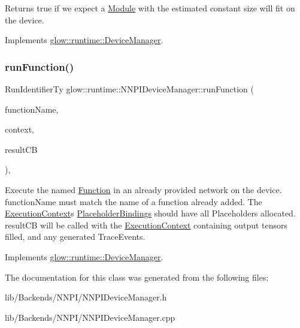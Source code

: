 \begin{DoxyReturn}{Returns}
true if we expect a \hyperlink{classglow_1_1_module}{Module} with the estimated constant size will fit on the device. 
\end{DoxyReturn}


Implements \hyperlink{classglow_1_1runtime_1_1_device_manager_ae9bba4abda9cb6aa1359a69e942feb22}{glow\+::runtime\+::\+Device\+Manager}.

\mbox{\label{classglow_1_1runtime_1_1_n_n_p_i_device_manager_a86f8010d5b5c6f235144d930f8392d3a}} 
\subsubsection{\texorpdfstring{run\+Function()}{runFunction()}}
{\footnotesize\ttfamily Run\+Identifier\+Ty glow\+::runtime\+::\+N\+N\+P\+I\+Device\+Manager\+::run\+Function (\begin{DoxyParamCaption}\item[{std\+::string}]{function\+Name,  }\item[{std\+::unique\+\_\+ptr$<$ \hyperlink{classglow_1_1_execution_context}{Execution\+Context} $>$}]{context,  }\item[{runtime\+::\+Result\+C\+B\+Ty}]{result\+CB }\end{DoxyParamCaption})\hspace{0.3cm}{\ttfamily [override]}, {\ttfamily [virtual]}}

Execute the named \hyperlink{classglow_1_1_function}{Function} in an already provided network on the device. function\+Name must match the name of a function already added. The \hyperlink{classglow_1_1_execution_context}{Execution\+Context}\textquotesingle{}s \hyperlink{classglow_1_1_placeholder_bindings}{Placeholder\+Bindings} should have all Placeholders allocated. result\+CB will be called with the \hyperlink{classglow_1_1_execution_context}{Execution\+Context} containing output tensors filled, and any generated Trace\+Events. 

Implements \hyperlink{classglow_1_1runtime_1_1_device_manager_ac182cdf6ed9f6903c11fa71c0446d1f7}{glow\+::runtime\+::\+Device\+Manager}.



The documentation for this class was generated from the following files\+:\begin{DoxyCompactItemize}
\item 
lib/\+Backends/\+N\+N\+P\+I/N\+N\+P\+I\+Device\+Manager.\+h\item 
lib/\+Backends/\+N\+N\+P\+I/N\+N\+P\+I\+Device\+Manager.\+cpp\end{DoxyCompactItemize}
